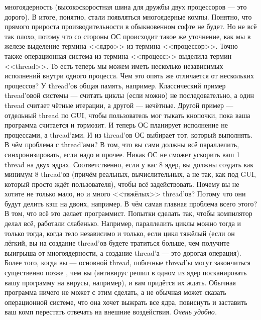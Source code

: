 \documentclass{article}
\begin{document}
многоядерность (высокоскоростная шина для дружбы двух процессоров --- это дорого). В итоге, понятно, стали появляться многоядерные компы. Понятно, что прямого прироста производительности в обыкновенном софте не будет. Но не всё так плохо, потому что со стороны ОС происходит такое же уточнение, как мы в железе выделение термина <<ядро>> из термина <<процессор>>. Точно также операционная система из термина <<процесс>> выделила термин <<thread>>. То есть теперь мы можем иметь несколько независимых исполнений внутри одного процесса. Чем это опять же отличается от нескольких процессов? У thread'ов общая память, например. Классический пример thread'овой системы --- считать циклы (если можно) не последовательно, а один thread считает чётные итерации, а другой --- нечётные. Другой пример --- отдельный thread по GUI, чтобы пользователь мог тыкать кнопочки, пока ваша программа считается и тормозит. И теперь ОС планирует исполнение не процессами, а thread'ами. И из thread'ов ОС выбирает тот, который выполнять. В чём проблема с thread'ами? В том, что вы сами должны всё параллелить, синхронизировать, если надо и прочее. Никак ОС не сможет ускорить ваш 1 thread на двух ядрах. Соответственно, если у вас 8 ядер, вы должны создать как минимум 8 thread'ов (причём реальных, вычислительных, а не так, как под GUI, который просто ждёт пользователя), чтобы всё задействовать. Почему вы не хотите не только мало, но и много <<тяжёлых>> thread'ов? Потому что они будут делить кэш на двоих, например. В чём самая главная проблема всего этого? В том, что всё это делает программист. Попытки сделать так, чтобы компилятор делал всё, работали слабенько. Например, параллелить циклы можно тогда и только тогда, когда тело независимо и только, если цикл тяжёлый (если он лёгкий, вы на создание thread'ов будете тратиться больше, чем получите выигрыша от многоядерности, а создание thread'а --- это дорогая операция). Более того, когда вы --- основной thread, побочные thread'ы могут закончиться существенно позже , чем вы (антивирус решил в одном из ядер посканировать вашу программу на вирусы, например), и вам придётся их ждать. Обычная программа ничего не может с этим сделать, а не обычная может сказать операционной системе, что она хочет выжрать все ядра, повиснуть и заставить ваш комп перестать отвечать на внешние воздействия. \textit{Очень удобно.}\\
\end{document}
